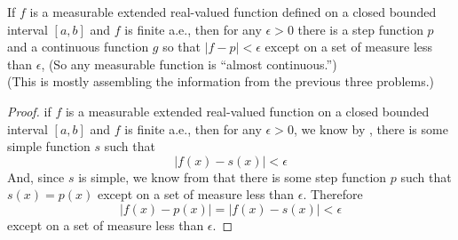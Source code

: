 \begin{pblm}%
	If $f$ is a measurable extended real-valued function defined on a closed 
	bounded interval $[a,b]$ and $f$ is finite a.e., then for any 
	$\epsilon > 0$ there is a step function $p$ and a continuous function $g$ 
	so that $|f-p|<\epsilon$ except on a set of measure less than $\epsilon$, 
	(So any measurable function is ``almost continuous.'')\\
	(This is mostly assembling the information from the previous three 
	problems.)
\begin{proof}
	if $f$ is a measurable extended real-valued function on a closed bounded 
	interval $[a,b]$ and $f$ is finite a.e., then for any $\epsilon > 0$, we
	know by , there is some simple function $s$ such that 
	\begin{equation*}
		|f(x) - s(x)| < \epsilon
	\end{equation*}
	And, since $s$ is simple, we know from  that 
	there is some step function $p$ such that 
	$s(x) = p(x)$ except on a set of measure less than $\epsilon$. 
	Therefore 
	\begin{equation*}
		|f(x) - p(x)| = |f(x) - s(x)| < \epsilon
	\end{equation*}
	except on a set of measure less than $\epsilon$. 
\end{proof}
\end{pblm}


